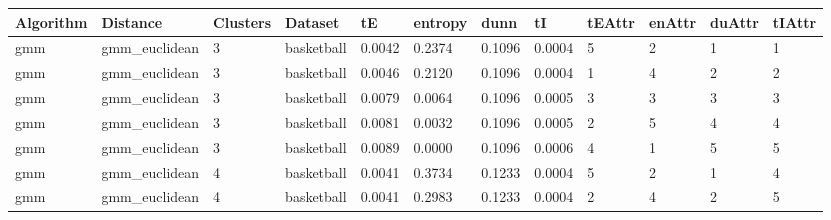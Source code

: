 {\small
\begin{longtable}{| p{1cm} | p{1.8cm} | p{0.7cm} | p{0.9cm} | p{0.5cm} | p{0.65cm} | p{0.5cm} | p{0.5cm} | p{0.55cm} | p{0.55cm} | p{0.6cm} | p{0.5cm} |}
\hline
\scriptsize  Algorithm & \scriptsize  Distance  &  \scriptsize Clusters & \scriptsize  Dataset & \scriptsize tE  & \scriptsize entropy & \scriptsize  dunn  & \scriptsize tI & \scriptsize tEAttr  & \scriptsize enAttr & \scriptsize duAttr & \scriptsize tIAttr \\
\hline
\scriptsize     gmm   & \scriptsize   gmm\_euclidean & \scriptsize    3    & \scriptsize basketball & \scriptsize    0.0042  &  \scriptsize 0.2374  & \scriptsize 0.1096 & \scriptsize    0.0004  &  \scriptsize    5  & \scriptsize    2  & \scriptsize    1  & \scriptsize    1 \\
\scriptsize     gmm   & \scriptsize   gmm\_euclidean  & \scriptsize    3   &  \scriptsize basketball  & \scriptsize    0.0046  &  \scriptsize 0.2120  & \scriptsize 0.1096 & \scriptsize    0.0004 &   \scriptsize    1  & \scriptsize    4 &  \scriptsize    2 &  \scriptsize    2 \\
\scriptsize     gmm   & \scriptsize   gmm\_euclidean & \scriptsize    3   &  \scriptsize basketball & \scriptsize    0.0079  &  \scriptsize 0.0064  &\scriptsize 0.1096 & \scriptsize    0.0005 &   \scriptsize    3  &  \scriptsize    3  &  \scriptsize    3  & \scriptsize    3 \\
\scriptsize     gmm   & \scriptsize   gmm\_euclidean & \scriptsize    3 &  \scriptsize basketball & \scriptsize    0.0081  &  \scriptsize 0.0032  & \scriptsize 0.1096 & \scriptsize    0.0005 &   \scriptsize    2  & \scriptsize    5  & \scriptsize    4  & \scriptsize    4 \\
\scriptsize     gmm   & \scriptsize   gmm\_euclidean & \scriptsize    3     & \scriptsize basketball & \scriptsize    0.0089  &  \scriptsize 0.0000 &  \scriptsize 0.1096 & \scriptsize    0.0006 &   \scriptsize    4  & \scriptsize    1  & \scriptsize    5  & \scriptsize    5 \\
\cline{3-12}
\scriptsize     gmm   & \scriptsize   gmm\_euclidean & \scriptsize    4     & \scriptsize basketball  & \scriptsize    0.0041  & \scriptsize 0.3734 &  \scriptsize 0.1233 & \scriptsize    0.0004 &   \scriptsize    5 & \scriptsize    2  & \scriptsize    1  & \scriptsize    4 \\
\scriptsize     gmm   & \scriptsize   gmm\_euclidean & \scriptsize    4     & \scriptsize basketball & \scriptsize    0.0041 &   \scriptsize 0.2983 & \scriptsize 0.1233 & \scriptsize    0.0004 &   \scriptsize    2 & \scriptsize    4 &  \scriptsize    2 &  \scriptsize    5 \\

\end{longtable}}
